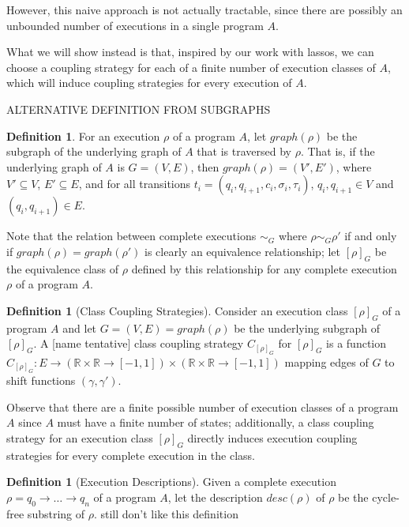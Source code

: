 \documentclass[12pt]{article}
\newcommand{\RR}{\mathbb{R}}
\theoremstyle{definition}
\newtheorem{defn}[thm]{Definition}
\begin{document}
However, this naive approach is not actually tractable, since there are possibly an unbounded number of executions in a single program $A$. 

What we will show instead is that, inspired by our work with lassos, we can choose a coupling strategy for each of a finite number of execution classes of $A$, which will induce coupling strategies for every execution of $A$. 

\hrulefill
{\color{red} ALTERNATIVE DEFINITION FROM SUBGRAPHS}
\begin{defn}
    For an execution $\rho$ of a program $A$, let $graph(\rho)$ be the subgraph of the underlying graph of $A$ that is traversed by $\rho$. That is, if the underlying graph of $A$ is $G=(V, E)$, then $graph(\rho) = (V', E')$, where $V'\subseteq V$, $E'\subseteq E$, and for all transitions $t_i = (q_i, q_{i+1}, c_i, \sigma_i, \tau_i)$, $q_i, q_{i+1}\in V$ and $(q_i, q_{i+1}) \in E$. 
\end{defn}

Note that the relation between complete executions $\sim_G$ where $\rho \sim_G\rho'$ if and only if $graph(\rho) = graph(\rho')$ is clearly an equivalence relationship; let $[\rho]_G$ be the equivalence class of $\rho$ defined by this relationship for any complete execution $\rho$ of a program $A$. 

\begin{defn}[Class Coupling Strategies]
    Consider an execution class $[\rho]_G$ of a program $A$ and let $G=(V, E) = graph(\rho)$ be the underlying subgraph of $[\rho]_G$. A [name tentative] class coupling strategy $C_{[\rho]_G}$ for $[\rho]_G$ is a function $C_{[\rho]_G}: E\to (\RR\times\RR\to[-1, 1])\times (\RR\times\RR\to[-1, 1])$ mapping edges of $G$ to shift functions $(\gamma, \gamma')$.
\end{defn}

Observe that there are a finite possible number of execution classes of a program $A$ since $A$ must have a finite number of states; additionally, a class coupling strategy for an execution class $[\rho]_G$ directly induces execution coupling strategies for every complete execution in the class. 


\hrulefill

\begin{defn}[Execution Descriptions]
    Given a complete execution $\rho = q_0\to \ldots \to q_n$ of a program $A$, let the description $desc(\rho)$ of $\rho$ be the cycle-free substring of $\rho$. {\color{red} still don't like this definition}
\end{defn}
\end{document}
